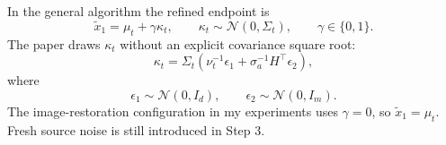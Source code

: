 \documentclass[11pt,a4paper]{article}
\newcommand{\Normal}{\mathcal{N}}
\newcommand{\sa}{\sigma_a}
\begin{document}
In the general algorithm the refined endpoint is
\begin{equation}
    \widetilde x_1
    =
    \mu_t+\gamma\kappa_t,
    \qquad
    \kappa_t\sim\Normal(0,\Sigma_t),
    \qquad
    \gamma\in\{0,1\}.
    \label{eq:refine}
\end{equation}
The paper draws $\kappa_t$ without an explicit covariance square root:
\begin{equation}
    \kappa_t
    =
    \Sigma_t
    \left(
        \nu_t^{-1}\epsilon_1
        +
        \sa^{-1}H^\top\epsilon_2
    \right),
    \label{eq:kappa}
\end{equation}
where
\begin{equation}
    \epsilon_1\sim\Normal(0,I_d),
    \qquad
    \epsilon_2\sim\Normal(0,I_m).
\end{equation}
The image-restoration configuration in my experiments uses $\gamma=0$,
so $\widetilde x_1=\mu_t$.
Fresh source noise is still introduced in Step 3.

\end{document}
